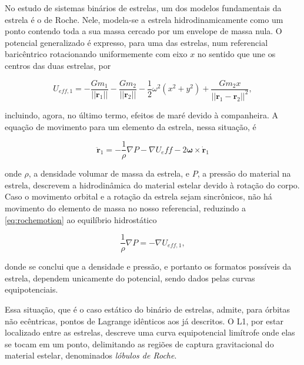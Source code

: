 No estudo de sistemas binários de estrelas, um dos modelos fundamentais da estrela é o de Roche. Nele, modela-se a estrela hidrodinamicamente como um ponto contendo toda a sua massa cercado por um envelope de massa nula. O potencial generalizado é expresso, para uma das estrelas, num referencial baricêntrico rotacionando uniformemente com eixo $x$ no sentido que une os centros das duas estrelas, por

\begin{equation}
    U_{eff, 1} = -\frac{Gm_1}{||\mathbf{r}_1||}-\frac{Gm_2}{||\mathbf{r}_2||}-\frac{1}{2}\omega^2(x^2 + y^2)+\frac{Gm_2x}{||\mathbf{r}_1 - \mathbf{r}_2||^2},
\end{equation}

incluindo, agora, no último termo, efeitos de maré devido à companheira. A equação de movimento para um elemento da estrela, nessa situação, é

\begin{equation}
    \label{eq:rochemotion}
    \ddot{\mathbf{r}}_1 = -\frac{1}{\rho}\nabla P - \nabla U_eff - 2\mathbf{\omega}\times\dot{\mathbf{r}}_1
\end{equation}

onde $\rho$, a densidade volumar de massa da estrela, e $P$, a pressão do material na estrela, descrevem a hidrodinâmica do material estelar devido à rotação do corpo. Caso o movimento orbital e a rotação da estrela sejam sincrônicos, não há movimento do elemento de massa no nosso referencial, reduzindo a \ref{eq:rochemotion} ao equilíbrio hidrostático

\begin{equation}
    \frac{1}{\rho}\nabla P = -\nabla U_{eff, 1},
\end{equation}

donde se conclui que a densidade e pressão, e portanto os formatos possíveis da estrela, dependem unicamente do potencial, sendo dados pelas curvas equipotenciais.

Essa situação, que é o caso estático do binário de estrelas, admite, para órbitas não ecêntricas, pontos de Lagrange idênticos aos já descritos. O L1, por estar localizado entre as estrelas, descreve uma curva equipotencial limítrofe onde elas se tocam em um ponto, delimitando as regiões de captura gravitacional do material estelar, denominados \textit{lóbulos de Roche}.